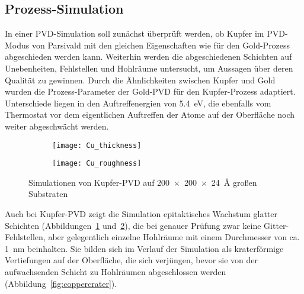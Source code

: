 \subsection{Prozess-Simulation}
\label{coppersimulation}

In einer PVD-Simulation soll zunächst überprüft werden, ob Kupfer im PVD-Modus von Parsivald mit den gleichen Eigenschaften wie für den Gold-Prozess abgeschieden werden kann.
Weiterhin werden die abgeschiedenen Schichten auf Unebenheiten, Fehlstellen und Hohlräume untersucht, um Aussagen über deren Qualität zu gewinnen.
Durch die Ähnlichkeiten zwischen Kupfer und Gold wurden die Prozess-Parameter der Gold-PVD für den Kupfer-Prozess adaptiert.
Unterschiede liegen in den Auftreffenergien von \SI{5.4}{\electronvolt}, die ebenfalls vom Thermostat vor dem eigentlichen Auftreffen der Atome auf der Oberfläche noch weiter abgeschwächt werden.

\begin{figure}[b!]
  \captionsetup[subfigure]{singlelinecheck=false}
  \def\subfigwidth{0.49\textwidth}
  \begin{subfigure}[t]{\subfigwidth}
    \texttt{[image: Cu\_thickness]}
    \label{fig:copperparsivald-a}
  \end{subfigure}
  \hfill
  \begin{subfigure}[t]{\subfigwidth}
    \texttt{[image: Cu\_roughness]}
    \label{fig:copperparsivald-b}
  \end{subfigure}
  \caption{Simulationen von Kupfer-PVD auf \SI{200x200x24}{\angstrom} großen Substraten}
  \label{fig:copperparsivald}
\end{figure}

Auch bei Kupfer-PVD zeigt die Simulation epitaktisches Wachstum glatter Schichten (Abbildungen~\ref{fig:copperparsivald-a} und~\ref{fig:copperparsivald-b}), die bei genauer Prüfung zwar keine Gitter-Fehlstellen, aber gelegentlich einzelne Hohlräume mit einem Durchmesser von ca. \SI{1}{\nano\meter} beinhalten.
Sie bilden sich im Verlauf der Simulation als kraterförmige Vertiefungen auf der Oberfläche, die sich verjüngen, bevor sie von der aufwachsenden Schicht zu Hohlräumen abgeschlossen werden (Abbildung~\ref{fig:coppercrater}).

